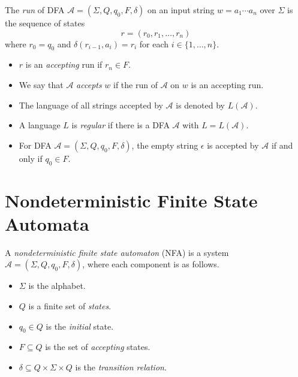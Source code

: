 \begin{definition}\label{def:dfa-run}
  The \emph{run} of DFA $\mathcal{A} = (\Sigma, Q, q_0, F, \delta)$ on an input
  string $w = a_1 \cdots a_n$ over $\Sigma$ is the sequence of states
  \begin{equation*}
    r = (r_0, r_1, \dots, r_n)
  \end{equation*}
  where $r_0 = q_0$ and $\delta(r_{i-1}, a_i) = r_i$ for each
  $i \in \{1, \dots, n\}$.
  \begin{itemize}
    \item $r$ is an \emph{accepting} run if $r_n \in F$.
    \item We say that $\mathcal{A}$ \emph{accepts} $w$ if the run of
      $\mathcal{A}$ on $w$ is an accepting run.
    \item The language of all strings accepted by $\mathcal{A}$ is denoted by
      $L(\mathcal{A})$.
    \item A language $L$ is \emph{regular} if there is a DFA $\mathcal{A}$ with
      $L = L(\mathcal{A})$.
  \end{itemize}
\end{definition}

\begin{remark}
  \leavevmode
  \begin{itemize}
    \item For DFA $\mathcal{A} = (\Sigma, Q, q_0, F, \delta)$, the empty string
      $\epsilon$ is accepted by $\mathcal{A}$ if and only if $q_0 \in F$.
  \end{itemize}
\end{remark}

\section{Nondeterministic Finite State Automata}
\begin{definition}\label{def:nfa}
  A \emph{nondeterministic finite state automaton} (NFA) is a system
  $\mathcal{A} = (\Sigma, Q, q_0, F, \delta)$, where each component is as
  follows.
  \begin{itemize}
    \item $\Sigma$ is the alphabet.
    \item $Q$ is a finite set of \emph{states}.
    \item $q_0 \in Q$ is the \emph{initial} state.
    \item $F \subseteq Q$ is the set of \emph{accepting} states.
    \item $\delta \subseteq Q \times \Sigma \times Q$ is the
      \emph{transition relation}.
  \end{itemize}
\end{definition}

